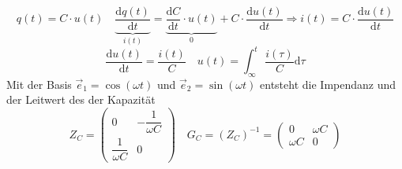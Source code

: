 \begin{equation}
\boxed{q\left(t\right)=C\cdot u\left(t\right)}\quad \boxed{\underbrace{\dfrac{\text{d}q(t)}{\text{d}t}}_{i(t)}=\underbrace{\dfrac{\text{d}C}{\text{d}t}\cdot u(t)}_{0}+C\cdot \dfrac{\text{d}u(t)}{\text{d}t}\Rightarrow i(t)=C\cdot \dfrac{\text{d}u(t)}{\text{d}t}}
\end{equation}
\begin{equation}
\boxed{\dfrac{\text{d}u(t)}{\text{d}t}=\dfrac{i(t)}{C}}\quad \boxed{u(t)=\displaystyle \int_{\infty}^t\dfrac{i\left(\tau\right)}{C}\text{d}\tau}
\end{equation}
Mit der Basis $\overrightarrow{e}_1=\cos\left(\omega t\right)$ und $\overrightarrow{e}_2=\sin\left(\omega t\right)$ entsteht die Impendanz und der Leitwert des der Kapazität
\begin{equation}
\boxed{Z_C=\begin{pmatrix}0&-\dfrac{1}{\omega C}\\\dfrac{1}{\omega C}&0\end{pmatrix}}\quad \boxed{G_C=\left(Z_C\right)^{-1}=\begin{pmatrix}0&\omega C\\\omega C&0\end{pmatrix}}
\end{equation}


